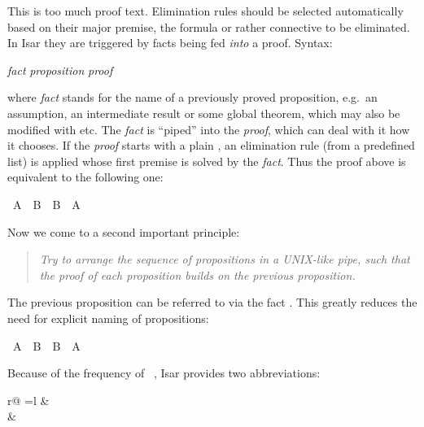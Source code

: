 \begin{isabellebody}
\begin{isamarkuptext}
This is too much proof text. Elimination rules should be selected
automatically based on their major premise, the formula or rather connective
to be eliminated. In Isar they are triggered by facts being fed
\emph{into} a proof. Syntax:
\begin{center}
 \emph{fact}  \emph{proposition} \emph{proof}
\end{center}
where \emph{fact} stands for the name of a previously proved
proposition, e.g.\ an assumption, an intermediate result or some global
theorem, which may also be modified with  etc.
The \emph{fact} is ``piped'' into the \emph{proof}, which can deal with it
how it chooses. If the \emph{proof} starts with a plain ,
an elimination rule (from a predefined list) is applied
whose first premise is solved by the \emph{fact}. Thus the proof above
is equivalent to the following one:%
\end{isamarkuptext}%
\isamarkuptrue%
\ {\isachardoublequote}A\ {\isasymand}\ B\ {\isasymlongrightarrow}\ B\ {\isasymand}\ A{\isachardoublequote}\isanewline
\isamarkupfalse%
\isamarkupfalse%
\isamarkupfalse%
\isamarkupfalse%
\isamarkupfalse%
\isamarkupfalse%
\isamarkupfalse%
\isamarkupfalse%
\isamarkupfalse%
\isamarkupfalse%
\isamarkupfalse%
%
\begin{isamarkuptext}%
Now we come to a second important principle:
\begin{quote}\em
Try to arrange the sequence of propositions in a UNIX-like pipe,
such that the proof of each proposition builds on the previous proposition.
\end{quote}
The previous proposition can be referred to via the fact .
This greatly reduces the need for explicit naming of propositions:%
\end{isamarkuptext}%
\isamarkuptrue%
\ {\isachardoublequote}A\ {\isasymand}\ B\ {\isasymlongrightarrow}\ B\ {\isasymand}\ A{\isachardoublequote}\isanewline
\isamarkupfalse%
\isamarkupfalse%
\isamarkupfalse%
\isamarkupfalse%
\isamarkupfalse%
\isamarkupfalse%
\isamarkupfalse%
\isamarkupfalse%
\isamarkupfalse%
\isamarkupfalse%
\isamarkupfalse%
%
\begin{isamarkuptext}%
\noindent Because of the frequency of ~, Isar provides two abbreviations:
\begin{center}
\begin{tabular}{r@ {\quad=\quad}l}
 &   \\
 &  
\end{tabular}
\end{center}


\end{isamarkuptext}
\end{isabellebody}
